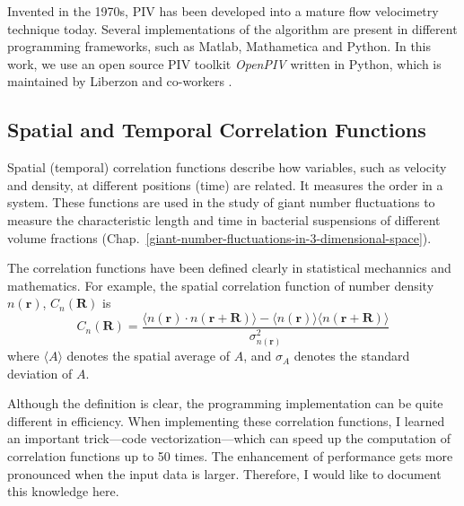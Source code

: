 Invented in the 1970s, PIV has been developed into a mature flow velocimetry technique today. Several implementations of the algorithm are present in different programming frameworks, such as Matlab, Mathametica and Python. In this work, we use an open source PIV toolkit \textit{OpenPIV} written in Python, which is maintained by Liberzon and co-workers \cite{OpenPIV-website, OpenPIV-paper}.

\subsection{Spatial and Temporal Correlation Functions}

Spatial (temporal) correlation functions describe how variables, such as velocity and density, at different positions (time) are related. It measures the order in a system. These functions are used in the study of giant number fluctuations to measure the characteristic length and time in bacterial suspensions of different volume fractions (Chap.~\ref{giant-number-fluctuations-in-3-dimensional-space}).

The correlation functions have been defined clearly in statistical mechannics and mathematics. For example, the spatial correlation function of number density $n(\bm{r})$, $C_n(\bm{R})$ is
\begin{equation}
	\label{eq:correlation-function}
	C_n(\bm{R}) = \frac{\langle n(\bm{r})\cdot n(\bm{r}+\bm{R}) \rangle - \langle n(\bm{r})\rangle \langle n(\bm{r}+\bm{R})\rangle}{\sigma_{n(\bm{r})}^2}
\end{equation}
%
where $\langle A \rangle$ denotes the spatial average of $A$, and $\sigma_A$ denotes the standard deviation of $A$.

Although the definition is clear, the programming implementation can be quite different in efficiency. When implementing these correlation functions, I learned an important trick---code vectorization---which can speed up the computation of correlation functions up to 50 times. The enhancement of performance gets more pronounced when the input data is larger. Therefore, I would like to document this knowledge here.


